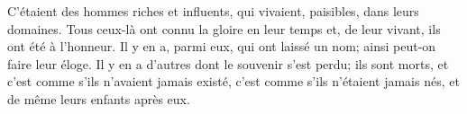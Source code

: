 C’étaient des hommes riches et influents, qui vivaient, paisibles, dans leurs domaines.
Tous ceux-là ont connu la gloire en leur temps
	et, de leur vivant, ils ont été à l’honneur.
Il y en a, parmi eux, qui ont laissé un nom; ainsi peut-on faire leur éloge.
Il y en a d’autres dont le souvenir s’est perdu;
	ils sont morts, et c’est comme s’ils n’avaient jamais existé,
	c’est comme s’ils n’étaient jamais nés, et de même leurs enfants après eux.
